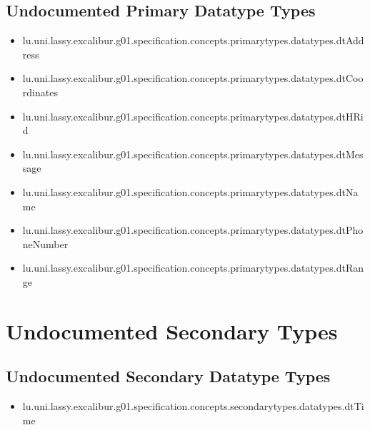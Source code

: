 \subsection[Undocumented Primary Datatype Types]{Undocumented Primary Datatype Types}
\begin{itemize}
\item lu.uni.lassy.excalibur.g01.specification.concepts.primarytypes.datatypes.dtAddress 
\item lu.uni.lassy.excalibur.g01.specification.concepts.primarytypes.datatypes.dtCoordinates 
\item lu.uni.lassy.excalibur.g01.specification.concepts.primarytypes.datatypes.dtHRid 
\item lu.uni.lassy.excalibur.g01.specification.concepts.primarytypes.datatypes.dtMessage 
\item lu.uni.lassy.excalibur.g01.specification.concepts.primarytypes.datatypes.dtName 
\item lu.uni.lassy.excalibur.g01.specification.concepts.primarytypes.datatypes.dtPhoneNumber 
\item lu.uni.lassy.excalibur.g01.specification.concepts.primarytypes.datatypes.dtRange 
\end{itemize}










\section[Undocumented Secondary Types]{Undocumented Secondary Types}


\subsection[Undocumented Secondary Datatype Types]{Undocumented Secondary Datatype Types}
\begin{itemize}
\item lu.uni.lassy.excalibur.g01.specification.concepts.secondarytypes.datatypes.dtTime 
\end{itemize}










